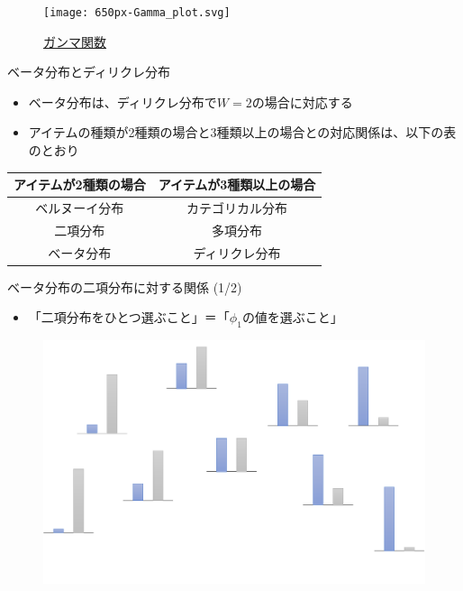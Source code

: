 \documentclass[aspectratio=169,unicode,dvipdfmx,14pt]{beamer}
\begin{document}
\begin{frame}
\begin{figure}[htbp]
\begin{center}
\texttt{[image: 650px-Gamma\_plot.svg]}
\caption{\href{https://en.wikipedia.org/wiki/Gamma_function}{ガンマ関数}}
\label{}
\end{center}
\end{figure}
\end{frame}

\begin{frame}{ベータ分布とディリクレ分布}
\begin{itemize}
\item ベータ分布は、ディリクレ分布で$W=2$の場合に対応する
\item アイテムの種類が2種類の場合と3種類以上の場合との対応関係は、以下の表のとおり
\end{itemize}
\begin{table}
\begin{center}
\begin{tabular}{|c|c|}
\hline アイテムが2種類の場合 & アイテムが3種類以上の場合 \\ \hline
ベルヌーイ分布 & カテゴリカル分布 \\
二項分布 & 多項分布 \\
ベータ分布 & ディリクレ分布 \\ \hline
\end{tabular}
\end{center}
\end{table}
\end{frame}

\begin{frame}{ベータ分布の二項分布に対する関係 (1/2)}
\begin{itemize}
\item 「二項分布をひとつ選ぶこと」＝「$\phi_1$の値を選ぶこと」
\end{itemize}
\begin{figure}[t]
\begin{center}
\includegraphics[scale=0.13]{beta1.png}
\end{center}
\end{figure}
\end{frame}
\end{document}
